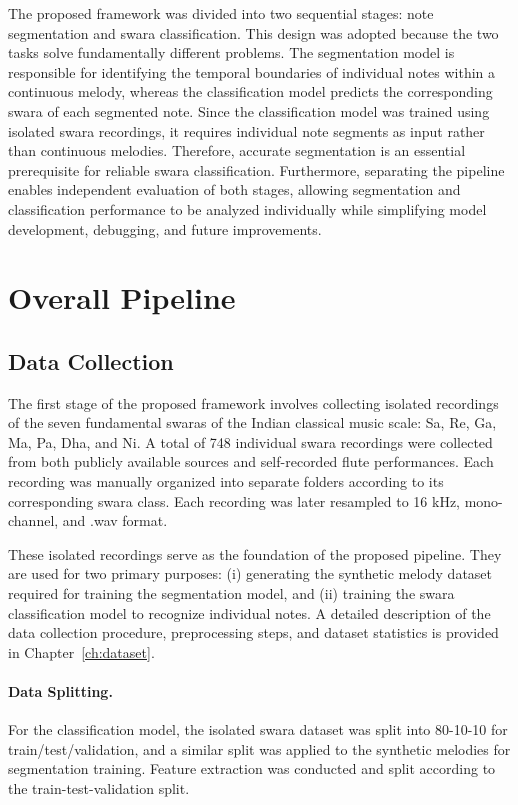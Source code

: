 The proposed framework was divided into two sequential stages: note segmentation and swara classification. This design was adopted because the two tasks solve fundamentally different problems. The segmentation model is responsible for identifying the temporal boundaries of individual notes within a continuous melody, whereas the classification model predicts the corresponding swara of each segmented note. Since the classification model was trained using isolated swara recordings, it requires individual note segments as input rather than continuous melodies. Therefore, accurate segmentation is an essential prerequisite for reliable swara classification. Furthermore, separating the pipeline enables independent evaluation of both stages, allowing segmentation and classification performance to be analyzed individually while simplifying model development, debugging, and future improvements.


\section{Overall Pipeline}

\subsection{Data Collection}

The first stage of the proposed framework involves collecting isolated recordings of the seven fundamental swaras of the Indian classical music scale: Sa, Re, Ga, Ma, Pa, Dha, and Ni. A total of 748 individual swara recordings were collected from both publicly available sources and self-recorded flute performances. Each recording was manually organized into separate folders according to its corresponding swara class. Each recording was later resampled to 16 kHz, mono-channel, and .wav format.

These isolated recordings serve as the foundation of the proposed pipeline. They are used for two primary purposes: (i) generating the synthetic melody dataset required for training the segmentation model, and (ii) training the swara classification model to recognize individual notes. A detailed description of the data collection procedure, preprocessing steps, and dataset statistics is provided in Chapter~\ref{ch:dataset}.

\paragraph{Data Splitting.} For the classification model, the isolated swara dataset was split into 80-10-10 for train/test/validation, and a similar split was applied to the synthetic melodies for segmentation training. Feature extraction was conducted and split according to the train-test-validation split.

